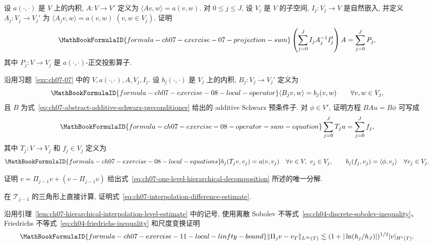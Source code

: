 \begin{MBExercise}
\label{exr:ch07-07}
设 $a(\cdot,\cdot)$ 是 $V$ 上的内积, $A:V\longrightarrow V'$ 定义为 $\langle Av,w\rangle=a(v,w)$. 对 $0\leq j\leq J$, 设 $V_j$ 是 $V$ 的子空间, $I_j:V_j\longrightarrow V$ 是自然嵌入, 并定义 $A_j:V_j\longrightarrow V_j'$ 为 $\langle A_jv,w\rangle=a(v,w)$ $(v,w\in V_j)$. 证明
\[
\MathBookFormulaID{formula-ch07-exercise-07-projection-sum}
\left(\sum_{j=0}^{J}I_jA_j^{-1}I_j^t\right)A
=\sum_{j=0}^{J}P_j,
\]
其中 $P_j:V\longrightarrow V_j$ 是 $a(\cdot,\cdot)$-正交投影算子.
\end{MBExercise}

\begin{MBExercise}
\label{exr:ch07-08}
沿用习题~\ref{exr:ch07-07} 中的 $V,a(\cdot,\cdot),A,V_j,I_j$. 设 $b_j(\cdot,\cdot)$ 是 $V_j$ 上的内积, $B_j:V_j\longrightarrow V_j'$ 定义为
\[
\MathBookFormulaID{formula-ch07-exercise-08-local-operator}
\langle B_jv,w\rangle=b_j(v,w)
\qquad\forall v,w\in V_j,
\]
且 $B$ 为式~\eqref{eq:ch07-abstract-additive-schwarz-preconditioner} 给出的 additive Schwarz 预条件子. 对 $\phi\in V'$, 证明方程 $BAu=B\phi$ 可写成
\[
\MathBookFormulaID{formula-ch07-exercise-08-operator-sum-equation}
\sum_{j=0}^{J}T_ju=\sum_{j=0}^{J}f_j,
\]
其中 $T_j:V\longrightarrow V_j$ 和 $f_j\in V_j$ 定义为
\[
\MathBookFormulaID{formula-ch07-exercise-08-local-equations}
b_j(T_jv,v_j)=a(v,v_j)
\quad\forall v\in V,\ v_j\in V_j,
\qquad
b_j(f_j,v_j)=\langle\phi,v_j\rangle
\quad\forall v_j\in V_j.
\]
\end{MBExercise}

\begin{MBExercise}
\label{exr:ch07-09}
证明 $v=\Pi_{j-1}v+(v-\Pi_{j-1}v)$ 给出式~\eqref{eq:ch07-one-level-hierarchical-decomposition} 所述的唯一分解.
\end{MBExercise}

\begin{MBExercise}
\label{exr:ch07-10}
在 $\mathcal T_{j-1}$ 的三角形上直接计算, 证明式~\eqref{eq:ch07-interpolation-difference-estimate}.
\end{MBExercise}

\begin{MBExercise}
\label{exr:ch07-11}
沿用引理~\ref{lem:ch07-hierarchical-interpolation-level-estimate} 中的记号, 使用离散 Sobolev 不等式~\eqref{eq:ch04-discrete-sobolev-inequality}、Friedrichs 不等式~\eqref{eq:ch04-friedrichs-inequality} 和尺度变换证明
\[
\MathBookFormulaID{formula-ch07-exercise-11-local-linfty-bound}
\|\Pi_jv-v_T\|_{L^\infty(T)}
\lesssim(1+|\ln(h_j/h_J)|)^{1/2}|v|_{H^1(T)}.
\]
\end{MBExercise}

